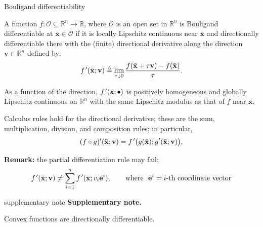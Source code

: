 \documentclass[aspectratio=169,xcolor=dvipsnames]{beamer}
\newcommand{\fp}{f\mkern2mu'}
\newenvironment{supplementarynote}{%
  \vspace{0.08cm}%
  \begin{beamercolorbox}[
    wd=\textwidth,sep=0.08cm,leftskip=0.08cm,rightskip=0.08cm
  ]{supplementary note}%
  \footnotesize
  \textcolor{SupplementAccent}{\textbf{Supplementary note.}}\enspace
}{%
  \end{beamercolorbox}%
}
\begin{document}
\begin{frame}{Bouligand differentiability}
  \small
  \setlength{\abovedisplayskip}{5pt}
  \setlength{\belowdisplayskip}{5pt}

  A function $f:\mathcal{O}\subseteq\mathbb{R}^n\to\mathbb{R}$, where
  $\mathcal{O}$ is an open set in $\mathbb{R}^n$ is
  {\color{MediumBlue}Bouligand differentiable} at
  $\bar{\mathbf{x}}\in\mathcal{O}$ if it is {\color{MediumBlue}locally
  Lipschitz continuous} near $\bar{\mathbf{x}}$ and directionally
  differentiable there with the (finite) directional derivative along the
  direction $\mathbf{v}\in\mathbb{R}^n$ defined by:
  \[
    \fp (\bar{\mathbf{x}};\mathbf{v})\triangleq\lim_{\tau\downarrow0}
    \frac{f(\bar{\mathbf{x}}+\tau\mathbf{v})-f(\bar{\mathbf{x}})}{\tau}.
  \]

  As a function of the direction, $\fp (\bar{\mathbf{x}};\bullet)$ is
  positively homogeneous and globally Lipschitz continuous on $\mathbb{R}^n$
  with the same Lipschitz modulus as that of $f$ near $\bar{\mathbf{x}}$.

  \vspace{0.06cm}
  Calculus rules hold for the directional derivative; these are the sum,
  multiplication, division, and composition rules; in particular,
  \[
    (f\circ g)'(\bar{\mathbf{x}};\mathbf{v})
    =\fp \bigl(g(\bar{\mathbf{x}});g'(\bar{\mathbf{x}};\mathbf{v})\bigr),
  \]

  \textbf{Remark:} the partial differentiation rule may fail;
  \[
    \fp (\bar{\mathbf{x}};\mathbf{v})\neq\sum_{i=1}^{n}
    \fp (\bar{\mathbf{x}};v_i\mathbf{e}^i),\qquad
    \text{where }\ \mathbf{e}^i=i\text{-th coordinate vector}
  \]

  \begin{supplementarynote}
    Convex functions are directionally differentiable.
  \end{supplementarynote}
\end{frame}
\end{document}
